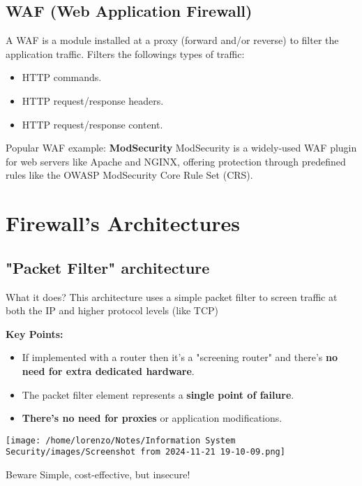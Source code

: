 \subsection{WAF (Web Application Firewall)}
A WAF is a module installed at a proxy (forward and/or reverse) to filter the application traffic. Filters the followings types of traffic:
\begin{itemize}
    \item HTTP commands.
    \item HTTP request/response headers.
    \item HTTP request/response content.
\end{itemize}
\begin{quotebox-grey}{Popular WAF example: \textbf{ModSecurity}}
    ModSecurity is a widely-used WAF plugin for web servers like Apache and NGINX, offering protection through predefined rules like the OWASP ModSecurity Core Rule Set (CRS).
\end{quotebox-grey}
\section{Firewall's Architectures}
\subsection{"Packet Filter" architecture}
\vspace{0.2cm}
\begin{quotebox-yellow}{What it does?}
This architecture uses a simple packet filter to screen traffic at both the IP and higher protocol levels (like TCP)
\end{quotebox-yellow}
\vspace{0.5cm}
\begin{minipage}{0.5\textwidth}
    \vspace{-0.5cm}
    \textbf{Key Points:}
    \begin{itemize}
        \item If implemented with a router then it's a "screening router" and there's \textbf{no need for extra dedicated hardware}.
        \item The packet filter element represents a \textbf{single point of failure}.
        \item \textbf{There's no need for proxies} or application modifications.
    \end{itemize}
\end{minipage}
\hfill
\begin{minipage}{0.5\textwidth}
    \centering
    \texttt{[image: /home/lorenzo/Notes/Information System Security/images/Screenshot from 2024-11-21 19-10-09.png]}
\end{minipage}
\begin{center}
    \begin{quotebox-red}{Beware}
        Simple, cost-effective, but insecure!
        \end{quotebox-red}   
\end{center}
\vspace{0.5cm}
